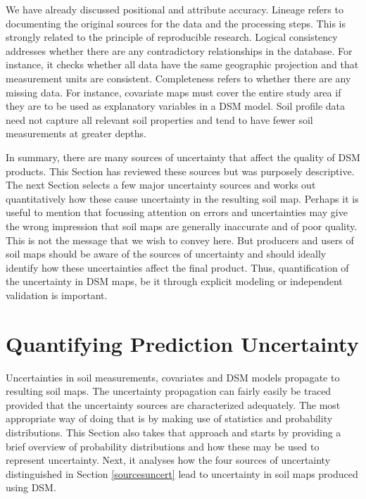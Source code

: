 \documentclass[10pt,b5paper,]{book}
\theoremstyle{definition}
\theoremstyle{definition}
\theoremstyle{definition}
\theoremstyle{remark}
\begin{document}
We have already discussed positional and attribute accuracy. Lineage
refers to documenting the original sources for the data and the
processing steps. This is strongly related to the principle of
reproducible research. Logical consistency addresses whether there are
any contradictory relationships in the database. For instance, it checks
whether all data have the same geographic projection and that
measurement units are consistent. Completeness refers to whether there
are any missing data. For instance, covariate maps must cover the entire
study area if they are to be used as explanatory variables in a DSM
model. Soil profile data need not capture all relevant soil properties
and tend to have fewer soil measurements at greater depths.

In summary, there are many sources of uncertainty that affect the
quality of DSM products. This Section has reviewed these sources but was
purposely descriptive. The next Section selects a few major uncertainty
sources and works out quantitatively how these cause uncertainty in the
resulting soil map. Perhaps it is useful to mention that focussing
attention on errors and uncertainties may give the wrong impression that
soil maps are generally inaccurate and of poor quality. This is not the
message that we wish to convey here. But producers and users of soil
maps should be aware of the sources of uncertainty and should ideally
identify how these uncertainties affect the final product. Thus,
quantification of the uncertainty in DSM maps, be it through explicit
modeling or independent validation is important.

\hypertarget{quantifying-prediction-uncertainty}{%
\section{Quantifying Prediction
Uncertainty}\label{quantifying-prediction-uncertainty}}

Uncertainties in soil measurements, covariates and DSM models propagate
to resulting soil maps. The uncertainty propagation can fairly easily be
traced provided that the uncertainty sources are characterized
adequately. The most appropriate way of doing that is by making use of
statistics and probability distributions. This Section also takes that
approach and starts by providing a brief overview of probability
distributions and how these may be used to represent uncertainty. Next,
it analyses how the four sources of uncertainty distinguished in Section
\ref{sourcesuncert} lead to uncertainty in soil maps produced using DSM.
\end{document}
